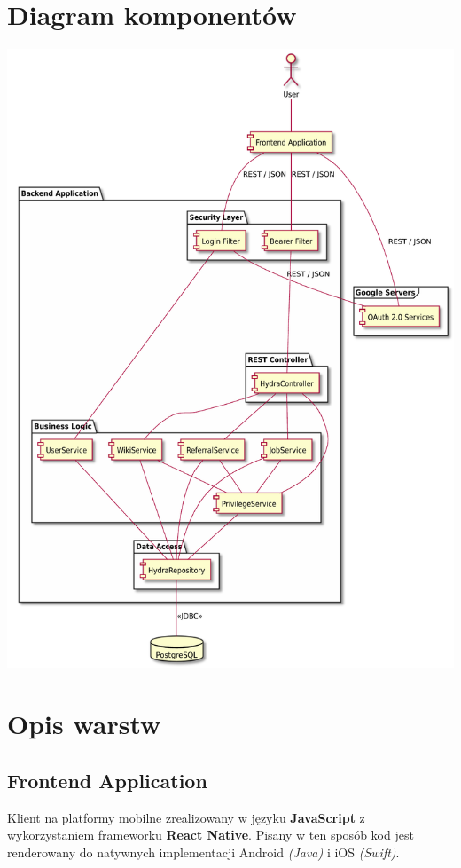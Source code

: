 \documentclass[oneside]{scrreprt}
\begin{document}
\section{Diagram komponentów}
\includegraphics[width=\textwidth, keepaspectratio]{graphics/hydra_component_diagram.pdf}

\section{Opis warstw}
\subsection{Frontend Application}
Klient na platformy mobilne zrealizowany w języku \textbf{JavaScript} z wykorzystaniem frameworku \textbf{React Native}.
Pisany w ten sposób kod jest renderowany do natywnych implementacji Android \textit{(Java)} i iOS \textit{(Swift)}.
\end{document}
